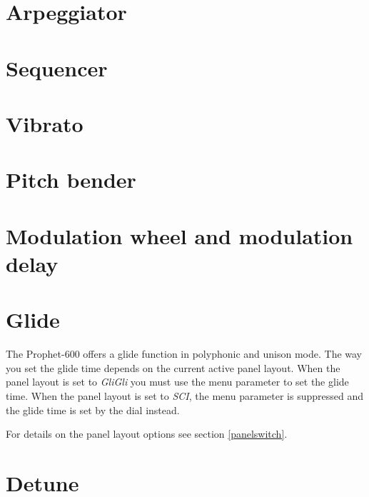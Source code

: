 \documentclass[landscape, 11pt, oneside, twoside]{report}
\newenvironment{flowtext}{\addmargin[0cm]{0cm}}{\endaddmargin} %
\begin{document}
\begin{flowtext}
\pagebreak

\section{Arpeggiator}\label{arp}



\pagebreak

\section{Sequencer}\label{seq}



\section{Vibrato}\label{vib}



\section{Pitch bender}\label{pitchbend}



\section{Modulation wheel and modulation delay}\label{modwheel}



\section{Glide}\label{glide}

The Prophet-600 offers a glide function in polyphonic and unison mode. The way you set the glide time depends on the current active panel layout. When the panel layout is set to \textit{GliGli} you must use the menu parameter \glide to set the glide time. When the panel layout is set to \textit{SCI}, the menu parameter \glide is suppressed and the glide time is set by the \glidepot dial instead. 

For details on the panel layout options see section \ref{panelswitch}. 

\section{Detune}\label{detune}


\end{flowtext}
\end{document}
